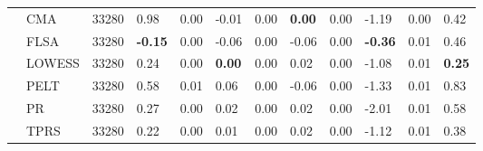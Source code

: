 \begin{table}[ht]
\begin{tabular}{llrlrlrlrlrl}
   & CMA & 33280 & 0.98 & 0.00 & -0.01 & 0.00 & \textbf{0.00} & 0.00 & -1.19 & 0.00 & 0.42 \\ 
   & FLSA & 33280 & \textbf{-0.15} & 0.00 & -0.06 & 0.00 & -0.06 & 0.00 & \textbf{-0.36} & 0.01 & 0.46 \\ 
   & LOWESS & 33280 & 0.24 & 0.00 & \textbf{0.00} & 0.00 & 0.02 & 0.00 & -1.08 & 0.01 & \textbf{0.25} \\ 
   & PELT & 33280 & 0.58 & 0.01 & 0.06 & 0.00 & -0.06 & 0.00 & -1.33 & 0.01 & 0.83 \\ 
   & PR & 33280 & 0.27 & 0.00 & 0.02 & 0.00 & 0.02 & 0.00 & -2.01 & 0.01 & 0.58 \\ 
   & TPRS & 33280 & 0.22 & 0.00 & 0.01 & 0.00 & 0.02 & 0.00 & -1.12 & 0.01 & 0.38 \\ 
   \bottomrule
\end{tabular}
\end{table}
